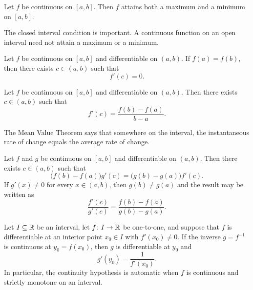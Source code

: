     \begin{theorem}
        Let $f$ be continuous on $[a,b]$. Then $f$ attains both a maximum and
        a minimum on $[a,b]$.
    \end{theorem}

    \begin{remark}
        The closed interval condition is important. A continuous function on an
        open interval need not attain a maximum or a minimum.
    \end{remark}

    \begin{theorem}
        Let $f$ be continuous on $[a,b]$ and differentiable on $(a,b)$. If
        $f(a)=f(b)$, then there exists $c\in(a,b)$ such that
        \[
            f'(c)=0.
        \]
    \end{theorem}

    \begin{theorem}
        Let $f$ be continuous on $[a,b]$ and differentiable on $(a,b)$. Then
        there exists $c\in(a,b)$ such that
        \[
            f'(c)
            =
            \frac{f(b)-f(a)}{b-a}.
        \]
    \end{theorem}

    \begin{idea}
        The Mean Value Theorem says that somewhere on the interval, the
        instantaneous rate of change equals the average rate of change.
    \end{idea}

    \begin{theorem}
        Let $f$ and $g$ be continuous on $[a,b]$ and differentiable on
        $(a,b)$. Then there exists $c\in(a,b)$ such that
        \[
            \bigl(f(b)-f(a)\bigr)g'(c)
            =
            \bigl(g(b)-g(a)\bigr)f'(c).
        \]
        If $g'(x)\neq 0$ for every $x\in(a,b)$, then $g(b)\neq g(a)$
        and the result may be written as
        \[
            \frac{f'(c)}{g'(c)}
            =
            \frac{f(b)-f(a)}{g(b)-g(a)}.
        \]
    \end{theorem}

    \begin{theorem}
        Let $I\subseteq\mathbb{R}$ be an interval, let $f\colon I\to\mathbb{R}$ be one-to-one, and
        suppose that $f$ is differentiable at an interior point $x_0\in I$ with
        $f'(x_0)\neq0$. If the inverse $g=f^{-1}$ is continuous at
        $y_0=f(x_0)$, then $g$ is differentiable at $y_0$ and
        \[
            g'(y_0)=\frac{1}{f'(x_0)}.
        \]
        In particular, the continuity hypothesis is automatic when $f$ is
        continuous and strictly monotone on an interval.
    \end{theorem}

